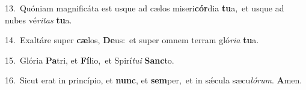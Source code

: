 {\numbfont\textcolor{\numbcolor}{13.}}~Quóniam magnificáta est usque ad cælos miseri\-\textbf{cór}\-dia \textbf{tu}\-a,~\star et usque ad nubes vé\-\textit{ri}\-\textit{tas} \textbf{tu}\-a.\par
{\numbfont\textcolor{\numbcolor}{14.}}~Exaltáre super \textbf{cæ}\-los, \textbf{De}\-us:~\star et super omnem terram gló\-\textit{ri}\-\textit{a} \textbf{tu}\-a.\par
{\numbfont\textcolor{\numbcolor}{15.}}~Glória \textbf{Pa}\-tri, et \textbf{Fí}\-lio,~\star et Spirí\-\textit{tu}\-\textit{i} \textbf{Sanc}\-to.\par
{\numbfont\textcolor{\numbcolor}{16.}}~Sicut erat in princípio, et \textbf{nunc}\-, et \textbf{sem}\-per,~\star et in sǽcula sæcu\-\textit{ló}\-\textit{rum}. \textbf{A}\-men.\par
